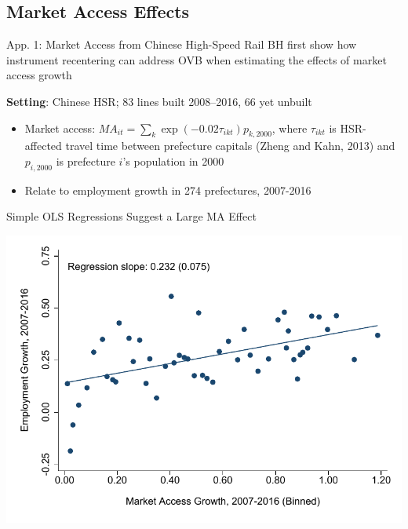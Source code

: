 \documentclass{beamer}
\begin{document}
\subsection{Market Access Effects}
\begin{frame}[label=HSRApplication]{App. 1: Market Access from Chinese High-Speed Rail}
	BH first show how instrument recentering can address OVB when estimating the effects of market access growth
	
	\vspace{0.4cm}
	\textbf{Setting}: Chinese HSR; 83 lines built 2008--2016, 66 yet unbuilt
	\vspace{0.1cm}
	\begin{itemize}
	\item Market access: $MA_{i t}= \sum_k \exp\left(-0.02\tau_{i k t}\right) p_{k,2000}$, where $\tau_{i k t}$ is HSR-affected travel time between prefecture capitals (Zheng and Kahn, 2013) and $p_{i,2000}$ is prefecture $i$'s population in 2000
	\vspace{0.1cm}
	\item Relate to employment growth in 274 prefectures, 2007-2016
	\end{itemize}
\end{frame}
	

\begin{frame}{Simple OLS Regressions Suggest a Large MA Effect} 
	\begin{center}
	\includegraphics[width=\textwidth]{lecture_includes/emp_ols_binscatter.pdf}
	\end{center}
\end{frame}
\end{document}
